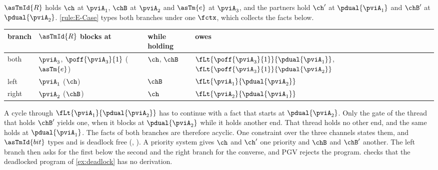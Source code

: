 $\asTmId{R}$ holds $\ch$ at $\pviA_1$, $\chB$ at $\pviA_2$ and
$\asTm{e}$ at $\pviA_3$, and the partners hold $\ch'$ at
$\pdual{\pviA_1}$ and $\chB'$ at $\pdual{\pviA_2}$. \ref{rule:E-Case}
types both branches under one $\fctx$, which collects the facts below.
\begin{center}
  \small
  \begin{tabular}{llll}
    branch & $\asTmId{R}$ blocks at & while holding & owes \\
    \hline
    both  & $\pviA_3$, $\poff{\pviA_3}{1}$ ($\asTm{e}$) & $\ch$, $\chB$ & $\fLt{\poff{\pviA_3}{1}}{\pdual{\pviA_1}}$, $\fLt{\poff{\pviA_3}{1}}{\pdual{\pviA_2}}$ \\
    left  & $\pviA_1$ ($\ch$)      & $\chB$        & $\fLt{\pviA_1}{\pdual{\pviA_2}}$ \\
    right & $\pviA_2$ ($\chB$)     & $\ch$         & $\fLt{\pviA_2}{\pdual{\pviA_1}}$
  \end{tabular}
\end{center}
A cycle through $\fLt{\pviA_1}{\pdual{\pviA_2}}$ has to continue with a
fact that starts at $\pdual{\pviA_2}$. Only the gate of the thread that
holds $\chB'$ yields one, when it blocks at $\pdual{\pviA_2}$ while it
holds another end. That thread holds no other end, and the same holds at
$\pdual{\pviA_1}$. The facts of both branches are therefore acyclic.
One constraint over the three channels states them, and
$\asTmId{bit}$ types and is deadlock free (,
). A priority system gives $\ch$ and $\ch'$ one
priority and $\chB$ and $\chB'$ another. The left branch then asks for
the first below the second and the right branch for the converse, and
PGV rejects the program.
 checks that the deadlocked program of
\cref{ex:deadlock} has no derivation.





